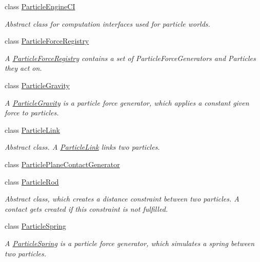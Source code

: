 \begin{DoxyCompactItemize}
class \mbox{\hyperlink{classr3_1_1_particle_engine_c_i}{Particle\+Engine\+CI}}
\begin{DoxyCompactList}\small\item\em Abstract class for computation interfaces used for particle worlds. \end{DoxyCompactList}\item 
class \mbox{\hyperlink{classr3_1_1_particle_force_registry}{Particle\+Force\+Registry}}
\begin{DoxyCompactList}\small\item\em A \mbox{\hyperlink{classr3_1_1_particle_force_registry}{Particle\+Force\+Registry}} contains a set of Particle\+Force\+Generators and Particles they act on. \end{DoxyCompactList}\item 
class \mbox{\hyperlink{classr3_1_1_particle_gravity}{Particle\+Gravity}}
\begin{DoxyCompactList}\small\item\em A \mbox{\hyperlink{classr3_1_1_particle_gravity}{Particle\+Gravity}} is a particle force generator, which applies a constant given force to particles. \end{DoxyCompactList}\item 
class \mbox{\hyperlink{classr3_1_1_particle_link}{Particle\+Link}}
\begin{DoxyCompactList}\small\item\em Abstract class. A \mbox{\hyperlink{classr3_1_1_particle_link}{Particle\+Link}} links two particles. \end{DoxyCompactList}\item 
class \mbox{\hyperlink{classr3_1_1_particle_plane_contact_generator}{Particle\+Plane\+Contact\+Generator}}
\item 
class \mbox{\hyperlink{classr3_1_1_particle_rod}{Particle\+Rod}}
\begin{DoxyCompactList}\small\item\em Abstract class, which creates a distance constraint between two particles. A contact gets created if this constraint is not fulfilled. \end{DoxyCompactList}\item 
class \mbox{\hyperlink{classr3_1_1_particle_spring}{Particle\+Spring}}
\begin{DoxyCompactList}\small\item\em A \mbox{\hyperlink{classr3_1_1_particle_spring}{Particle\+Spring}} is a particle force generator, which simulates a spring between two particles. \end{DoxyCompactList}\item 

\end{DoxyCompactItemize}
